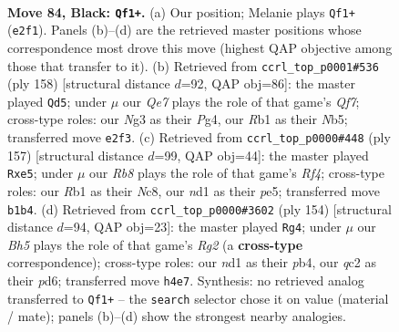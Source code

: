 \documentclass[11pt]{article}
\begin{document}
\clearpage

\begin{figure}[p]\centering
\begin{subfigure}{0.46\textwidth}\centering
\resizebox{\linewidth}{!}{%
\newchessgame
\chessboard[
  setfen={8/6k1/8/P1p2p2/3p1Ppb/4P1n1/R1QBq3/1r1N2K1 b - - 12 84},
  showmover=false,
  pgfstyle=straightmove, color=movearrow, markmove={e2-f1}
]}
\caption{}
\end{subfigure}\hfill
\begin{subfigure}{0.46\textwidth}\centering
\resizebox{\linewidth}{!}{%
\newchessgame
\chessboard[
  setfen={3r4/1p3Qbk/2qB1p2/1Np2Pp1/2P1P1P1/PP2K3/8/8 w - - 3 80},
  showmover=false,
  pgfstyle=straightmove, color=movearrow, markmove={f7-d5}
]}
\caption{}
\end{subfigure}
\\[4pt]
\begin{subfigure}{0.46\textwidth}\centering
\resizebox{\linewidth}{!}{%
\newchessgame
\chessboard[
  setfen={2n5/1kq5/1p2Q3/p2pPr2/P6P/1PN3RK/8/8 b - - 0 79},
  showmover=false,
  pgfstyle=straightmove, color=movearrow, markmove={f5-e5}
]}
\caption{}
\end{subfigure}\hfill
\begin{subfigure}{0.46\textwidth}\centering
\resizebox{\linewidth}{!}{%
\newchessgame
\chessboard[
  setfen={8/r3q2k/P2p2pP/2p5/1pQbP3/1P3R2/6R1/4K3 w - - 12 78},
  showmover=false,
  pgfstyle=straightmove, color=movearrow, markmove={g2-g4}
]}
\caption{}
\end{subfigure}
\caption{\textbf{Move 84, Black: \texttt{Qf1+}.} (a) Our position; Melanie plays \texttt{Qf1+} (\texttt{e2f1}). Panels (b)--(d) are the retrieved master positions whose correspondence most drove this move (highest QAP objective among those that transfer to it). (b) Retrieved from \texttt{ccrl\_top\_p0001\#536} (ply 158) [structural distance $d$=92, QAP obj=86]: the master played \texttt{Qd5}; under $\mu$ our \emph{Qe7} plays the role of that game's \emph{Qf7}; cross-type roles: our \emph{N}g3 as their \emph{P}g4, our \emph{R}b1 as their \emph{N}b5; transferred move \texttt{e2f3}. (c) Retrieved from \texttt{ccrl\_top\_p0000\#448} (ply 157) [structural distance $d$=99, QAP obj=44]: the master played \texttt{Rxe5}; under $\mu$ our \emph{Rb8} plays the role of that game's \emph{Rf4}; cross-type roles: our \emph{R}b1 as their \emph{N}c8, our \emph{n}d1 as their \emph{p}e5; transferred move \texttt{b1b4}. (d) Retrieved from \texttt{ccrl\_top\_p0000\#3602} (ply 154) [structural distance $d$=94, QAP obj=23]: the master played \texttt{Rg4}; under $\mu$ our \emph{Bh5} plays the role of that game's \emph{Rg2} (a \textbf{cross-type} correspondence); cross-type roles: our \emph{n}d1 as their \emph{p}b4, our \emph{q}c2 as their \emph{p}d6; transferred move \texttt{h4e7}. Synthesis: no retrieved analog transferred to \texttt{Qf1+} -- the \texttt{search} selector chose it on value (material / mate); panels (b)--(d) show the strongest nearby analogies.}
\label{fig:thought-m167}
\end{figure}
\end{document}
